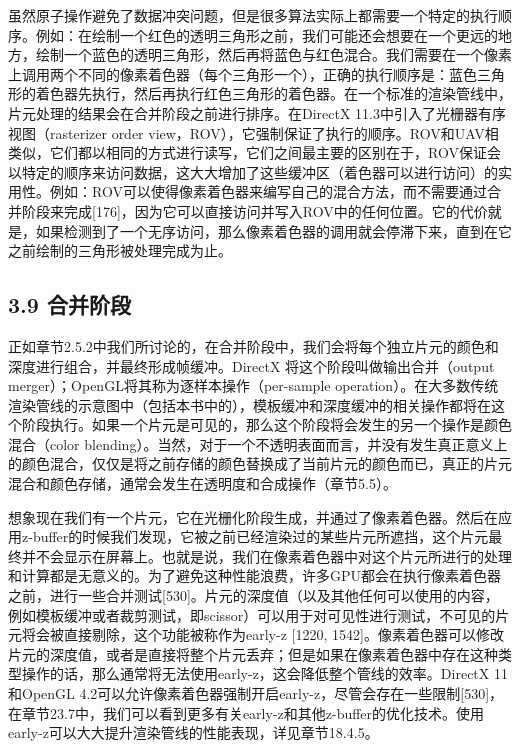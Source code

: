 \documentclass[
  paper=a4,
  ,captions=tableheading
]{scrartcl}
\begin{document}
虽然原子操作避免了数据冲突问题，但是很多算法实际上都需要一个特定的执行顺序。例如：在绘制一个红色的透明三角形之前，我们可能还会想要在一个更远的地方，绘制一个蓝色的透明三角形，然后再将蓝色与红色混合。我们需要在一个像素上调用两个不同的像素着色器（每个三角形一个），正确的执行顺序是：蓝色三角形的着色器先执行，然后再执行红色三角形的着色器。在一个标准的渲染管线中，片元处理的结果会在合并阶段之前进行排序。在DirectX
11.3中引入了光栅器有序视图（rasterizer order
view，ROV），它强制保证了执行的顺序。ROV和UAV相类似，它们都以相同的方式进行读写，它们之间最主要的区别在于，ROV保证会以特定的顺序来访问数据，这大大增加了这些缓冲区（着色器可以进行访问）的实用性。例如：ROV可以使得像素着色器来编写自己的混合方法，而不需要通过合并阶段来完成{[}176{]}，因为它可以直接访问并写入ROV中的任何位置。它的代价就是，如果检测到了一个无序访问，那么像素着色器的调用就会停滞下来，直到在它之前绘制的三角形被处理完成为止。

\subsection{3.9 合并阶段}\label{ux5408ux5e76ux9636ux6bb5}

正如章节2.5.2中我们所讨论的，在合并阶段中，我们会将每个独立片元的颜色和深度进行组合，并最终形成帧缓冲。DirectX
将这个阶段叫做输出合并（output
merger）；OpenGL将其称为逐样本操作（per-sample
operation）。在大多数传统渲染管线的示意图中（包括本书中的），模板缓冲和深度缓冲的相关操作都将在这个阶段执行。如果一个片元是可见的，那么这个阶段将会发生的另一个操作是颜色混合（color
blending）。当然，对于一个不透明表面而言，并没有发生真正意义上的颜色混合，仅仅是将之前存储的颜色替换成了当前片元的颜色而已，真正的片元混合和颜色存储，通常会发生在透明度和合成操作（章节5.5）。

想象现在我们有一个片元，它在光栅化阶段生成，并通过了像素着色器。然后在应用z-buffer的时候我们发现，它被之前已经渲染过的某些片元所遮挡，这个片元最终并不会显示在屏幕上。也就是说，我们在像素着色器中对这个片元所进行的处理和计算都是无意义的。为了避免这种性能浪费，许多GPU都会在执行像素着色器之前，进行一些合并测试{[}530{]}。片元的深度值（以及其他任何可以使用的内容，例如模板缓冲或者裁剪测试，即scissor）可以用于对可见性进行测试，不可见的片元将会被直接剔除，这个功能被称作为early-z
{[}1220,
1542{]}。像素着色器可以修改片元的深度值，或者是直接将整个片元丢弃；但是如果在像素着色器中存在这种类型操作的话，那么通常将无法使用early-z，这会降低整个管线的效率。DirectX
11和OpenGL
4.2可以允许像素着色器强制开启early-z，尽管会存在一些限制{[}530{]}，在章节23.7中，我们可以看到更多有关early-z和其他z-buffer的优化技术。使用early-z可以大大提升渲染管线的性能表现，详见章节18.4.5。
\end{document}
